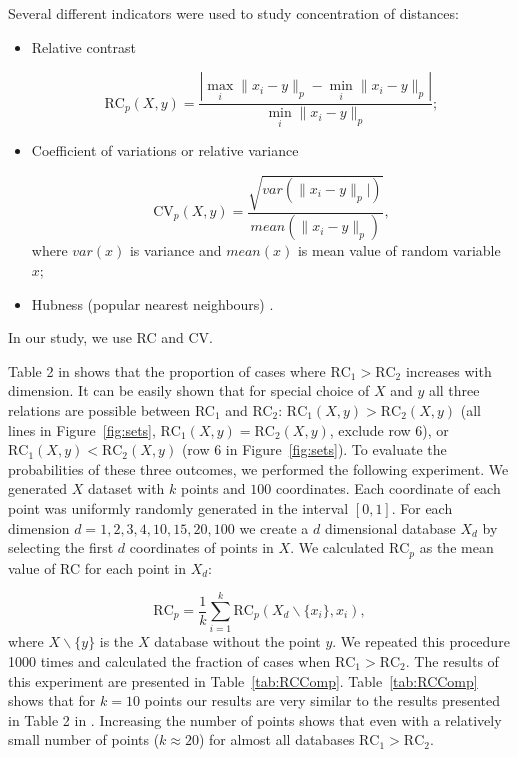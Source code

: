\documentclass[entropy,article,submit,moreauthors,pdftex]{Definitions/mdpi}
\begin{document}
Several different indicators were used to study concentration of distances:
\begin{itemize}
\item Relative contrast \cite{beyer1999, aggarwal2001, francois2007concentration}

\begin{equation}
\text{RC}_p(X,y)=\frac{|\max_i \|x_i-y\|_p - \min_i \|x_i-y\|_p|}{\min_i \|x_i-y\|_p}; \label{eq:RC}
\end{equation}
\item Coefficient of variations or relative variance \cite{demartines1994analyse, yianilos1999excluded, francois2007concentration}

\begin{equation}
\text{CV}_p(X,y)=\frac{\sqrt{var(\|x_i-y\|_p|)}}{mean(\|x_i-y\|_p)}, \label{eq:CV}
\end{equation}
where $var(x)$ is variance and $mean(x)$ is mean value of random variable $x$;
\item Hubness (popular nearest neighbours) \cite{radovanovic2010}.
\end{itemize}
In our study, we use RC and CV.

Table 2  in \cite{aggarwal2001}  shows that the proportion of cases where $\text{RC}_1>\text{RC}_2$ increases with dimension. It can be easily shown that for special choice of $X$ and $y$ all three relations are possible between RC$_1$ and RC$_2$: $\text{RC}_1(X,y)>\text{RC}_2(X,y)$ (all lines in Figure~\ref{fig:sets}, $\text{RC}_1(X,y)=\text{RC}_2(X,y)$, exclude row 6), or $\text{RC}_1(X,y)<\text{RC}_2(X,y)$ (row 6 in Figure~\ref{fig:sets}). To evaluate the probabilities of these three outcomes, we performed the following experiment. We generated $X$ dataset with $k$ points and $100$ coordinates. Each coordinate of each point was uniformly randomly generated in the interval $[0, 1]$. For each dimension $d=1, 2, 3, 4, 10, 15, 20, 100$ we create a $d$ dimensional database $X_d$ by selecting the first $d$ coordinates of points in $X$. We calculated $\text{RC}_p$ as the mean value of RC for each point in $X_d$:

\begin{equation*}
\text{RC}_p=\frac{1}{k}\sum_{i=1}^{k}\text{RC}_p(X_d\backslash \{x_i\},x_i),
\end{equation*}
where $X\backslash\{y\}$ is the $X$ database without the point $y$. We repeated this procedure 1000 times and calculated the fraction of cases when $\text{RC}_1>\text{RC}_2$. The results of this experiment are presented in Table~\ref{tab:RCComp}. Table~\ref{tab:RCComp} shows that for $k=10$ points our results are very similar to the results  presented in  Table 2 in \cite{aggarwal2001}. Increasing the number of points shows that even with a relatively small number of points ($k\approx 20$) for almost all databases $\text{RC}_1>\text{RC}_2$.
\end{document}
